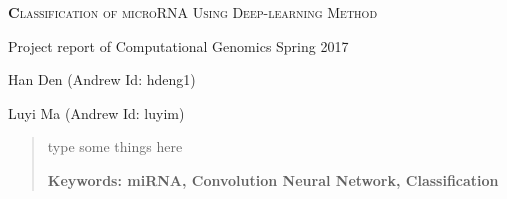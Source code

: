 \documentclass[letterpaper, 11pt]{article}
\begin{document}
\begin{center}
{\Large
	\textsc{\textbf Classification of microRNA Using Deep-learning Method}
}

\vspace{0.3cm}

\normalsize Project report of Computational Genomics Spring 2017

\vspace{0.5cm}

{\small
	Han Den (Andrew Id: hdeng1)
	
	Luyi Ma (Andrew Id: luyim)
}
\end{center}

\begin{abstract}
type some things here

\vspace{2mm}
\bfseries{ Keywords: miRNA, Convolution Neural Network, Classification}
\end{abstract}
\end{document}
